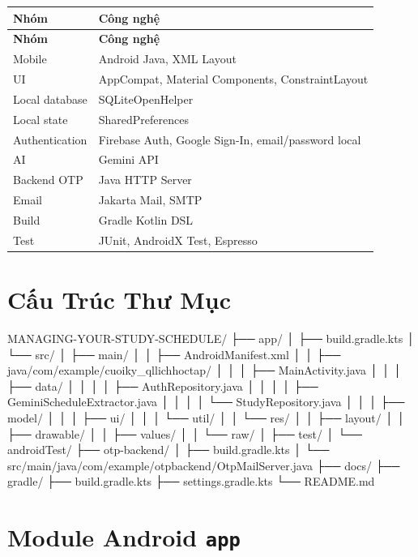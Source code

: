 \documentclass[12pt,a4paper]{report}
\begin{document}
\begin{longtable}{|>{\raggedright\arraybackslash}p{}|>{\raggedright\arraybackslash}p{}|}
\hline
\textbf{Nhóm} & \textbf{Công nghệ} \\ \hline
\endfirsthead
\hline
\textbf{Nhóm} & \textbf{Công nghệ} \\ \hline
\endhead
Mobile & Android Java, XML Layout \\ \hline
UI & AppCompat, Material Components, ConstraintLayout \\ \hline
Local database & SQLiteOpenHelper \\ \hline
Local state & SharedPreferences \\ \hline
Authentication & Firebase Auth, Google Sign-In, email/password local \\ \hline
AI & Gemini API \\ \hline
Backend OTP & Java HTTP Server \\ \hline
Email & Jakarta Mail, SMTP \\ \hline
Build & Gradle Kotlin DSL \\ \hline
Test & JUnit, AndroidX Test, Espresso \\ \hline
\end{longtable}

\section{Cấu Trúc Thư Mục}

\begin{CodeBlock}
MANAGING-YOUR-STUDY-SCHEDULE/
├── app/
│   ├── build.gradle.kts
│   └── src/
│       ├── main/
│       │   ├── AndroidManifest.xml
│       │   ├── java/com/example/cuoiky_qllichhoctap/
│       │   │   ├── MainActivity.java
│       │   │   ├── data/
│       │   │   │   ├── AuthRepository.java
│       │   │   │   ├── GeminiScheduleExtractor.java
│       │   │   │   └── StudyRepository.java
│       │   │   ├── model/
│       │   │   ├── ui/
│       │   │   └── util/
│       │   └── res/
│       │       ├── layout/
│       │       ├── drawable/
│       │       ├── values/
│       │       └── raw/
│       ├── test/
│       └── androidTest/
├── otp-backend/
│   ├── build.gradle.kts
│   └── src/main/java/com/example/otpbackend/OtpMailServer.java
├── docs/
├── gradle/
├── build.gradle.kts
├── settings.gradle.kts
└── README.md
\end{CodeBlock}

\section{Module Android \texttt{app}}
\end{document}
